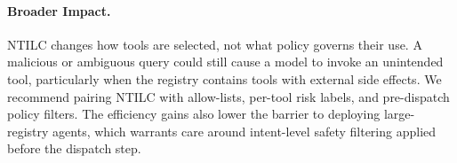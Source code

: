 \documentclass{article}
\begin{document}
\paragraph{Broader Impact.}
NTILC changes how tools are selected, not what policy governs their use.
A malicious or ambiguous query could still cause a model to invoke an unintended tool, particularly when the registry contains tools with external side effects.
We recommend pairing NTILC with allow-lists, per-tool risk labels, and pre-dispatch policy filters.
The efficiency gains also lower the barrier to deploying large-registry agents, which warrants care around intent-level safety filtering applied before the dispatch step.



\end{document}
